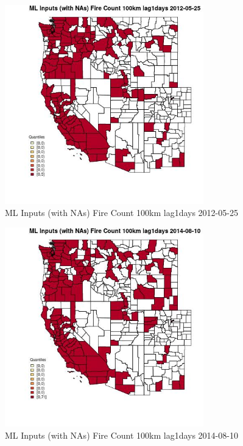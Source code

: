 \begin{figure} 
\centering  
\includegraphics[width=0.77\textwidth]{Code_Outputs/Report_ML_input_PM25_Step4_part_e_de_duplicated_aves_compiled_2019-05-18wNAs_CountyFire_Count_100km_lag1daysMean2012-05-25_2012-05-25.jpg} 
\caption{\label{fig:Report_ML_input_PM25_Step4_part_e_de_duplicated_aves_compiled_2019-05-18wNAsCountyFire_Count_100km_lag1daysMean2012-05-25_2012-05-25}ML Inputs (with NAs) Fire Count 100km lag1days 2012-05-25} 
\end{figure} 
 

\begin{figure} 
\centering  
\includegraphics[width=0.77\textwidth]{Code_Outputs/Report_ML_input_PM25_Step4_part_e_de_duplicated_aves_compiled_2019-05-18wNAs_CountyFire_Count_100km_lag1daysMean2014-08-10_2014-08-10.jpg} 
\caption{\label{fig:Report_ML_input_PM25_Step4_part_e_de_duplicated_aves_compiled_2019-05-18wNAsCountyFire_Count_100km_lag1daysMean2014-08-10_2014-08-10}ML Inputs (with NAs) Fire Count 100km lag1days 2014-08-10} 
\end{figure} 
 

